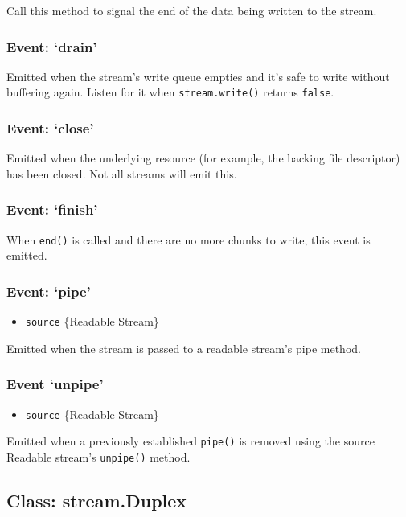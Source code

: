 Call this method to signal the end of the data being written to the
stream.

\subsubsection{Event: `drain'}

Emitted when the stream's write queue empties and it's safe to write
without buffering again. Listen for it when \texttt{stream.write()}
returns \texttt{false}.

\subsubsection{Event: `close'}

Emitted when the underlying resource (for example, the backing file
descriptor) has been closed. Not all streams will emit this.

\subsubsection{Event: `finish'}

When \texttt{end()} is called and there are no more chunks to write,
this event is emitted.

\subsubsection{Event: `pipe'}

\begin{itemize}
\item
  \texttt{source} \{Readable Stream\}
\end{itemize}

Emitted when the stream is passed to a readable stream's pipe method.

\subsubsection{Event `unpipe'}

\begin{itemize}
\item
  \texttt{source} \{Readable Stream\}
\end{itemize}

Emitted when a previously established \texttt{pipe()} is removed using
the source Readable stream's \texttt{unpipe()} method.

\subsection{Class: stream.Duplex}

